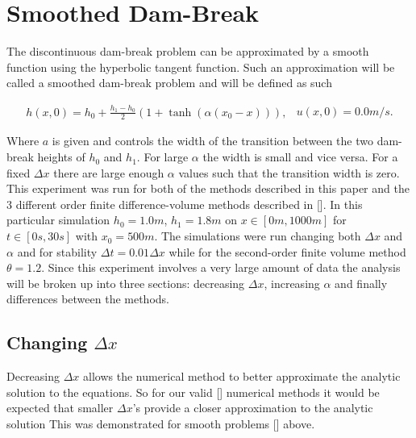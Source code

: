\documentclass[SingleSpace,12pt,Proceedings]{Serre_ASCE}
\begin{document}
\section{Smoothed Dam-Break}
\label{section:smootheddambreak}
The discontinuous dam-break problem can be approximated by a smooth function using the hyperbolic tangent function. Such an approximation will be called a smoothed dam-break problem and will be defined as such
\begin{linenomath*}
\begin{subequations}
\begin{gather}
h(x,0) = h_0 + \frac{h_1 - h_0}{2}\left(1 + \tanh\left(\alpha\left(x_0 - x\right)\right)\right),
\end{gather}
\begin{gather}
u(x,0) = 0.0m/s.
\end{gather}
\end{subequations}
\label{eq:sdbi}
\end{linenomath*}
Where $a$ is given and controls the width of the transition between the two dam-break heights of $h_0$ and $h_1$. For large $\alpha$ the width is small and vice versa. For a fixed $\Delta x$ there are large enough $\alpha$ values such that the transition width is zero. This experiment was run for both of the methods described in this paper and the 3 different order finite difference-volume methods described in []. In this particular simulation $h_0 = 1.0m$, $h_1 = 1.8m$ on $x \in [0m,1000m]$ for $t \in [0s,30s]$ with $x_0 = 500m$. The simulations were run changing both $\Delta x$ and $\alpha$ and for stability $\Delta t = 0.01 \Delta x$ while for the second-order finite volume method $\theta = 1.2$. Since this experiment involves a very large amount of data the analysis will be broken up into three sections: decreasing $\Delta x$, increasing $\alpha$ and finally differences between the methods. 

\subsection{Changing $\Delta x$}
Decreasing $\Delta x$ allows the numerical method to better approximate the analytic solution to the equations. So for our valid [] numerical methods it would be expected that smaller $\Delta x$'s provide a closer approximation to the analytic solution This was demonstrated for smooth problems [] above.
\end{document}
